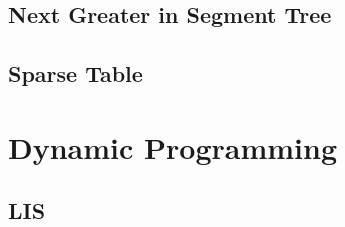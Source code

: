 \subsection{Next Greater in Segment Tree}

\subsection{Sparse Table}


\section{Dynamic Programming}

\subsection{LIS}



